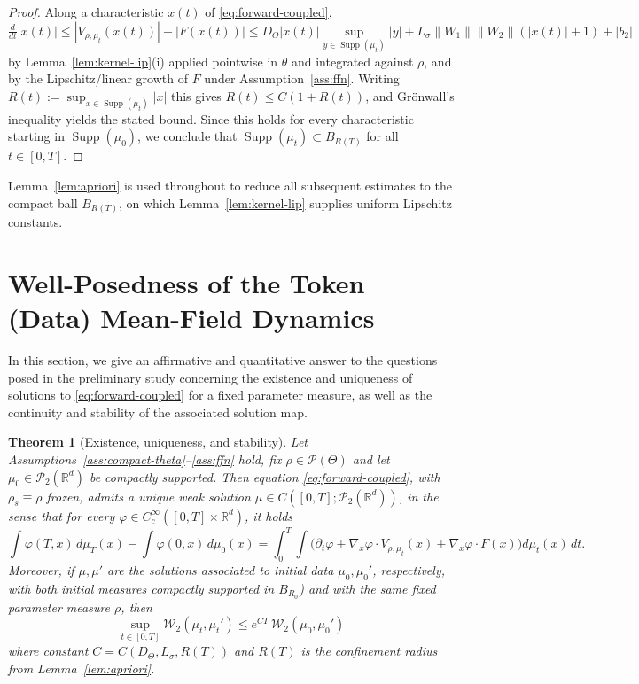 \documentclass[11pt,a4wide]{article}
\newtheorem{theorem}{Theorem}[section]
\theoremstyle{definition}
\newcommand{\R}{\mathbb{R}}
\newcommand{\Prob}{\mathcal{P}}
\newcommand{\Wass}{\mathcal{W}}
\DeclareMathOperator{\Supp}{Supp}
\begin{document}
\begin{proof}
Along a characteristic $x(t)$ of \eqref{eq:forward-coupled}, 
$$
\tfrac{d}{dt}|x(t)|\le |V_{\rho,\mu_t}(x(t))| + |F(x(t))| \le D_\Theta |x(t)| \sup_{y\in\Supp(\mu_t)}|y| + L_\sigma\|W_1\|\|W_2\|(|x(t)|+1)+|b_2|
$$
 by Lemma~\ref{lem:kernel-lip}(i) applied pointwise in $\theta$ and integrated against $\rho$, and by the Lipschitz/linear growth of $F$ under Assumption~\ref{ass:ffn}. Writing $R(t):=\sup_{x \in \Supp(\mu_t)}|x|$ this gives $\dot R(t)\le C(1+R(t))$, and Gr\"onwall's inequality yields the stated bound. Since this holds for every characteristic starting in $\Supp(\mu_0)$, we conclude that $\Supp(\mu_t)\subset B_{R(T)}$ for all $t\in[0,T]$.  
\end{proof}
 Lemma~\ref{lem:apriori} is used throughout to reduce all subsequent estimates to the compact ball $B_{R(T)}$, on which Lemma~\ref{lem:kernel-lip} supplies uniform Lipschitz constants.

\section{Well-Posedness of the Token (Data) Mean-Field Dynamics}
\label{sec:token-mf}

In this section,  we give an affirmative and quantitative answer  to the  questions posed in the preliminary study concerning the  existence and uniqueness of  solutions to \eqref{eq:forward-coupled} for a fixed parameter measure,  as well as the  continuity and stability of the associated solution map.

\begin{theorem}[Existence, uniqueness, and stability]
\label{thm:token-wp}
Let Assumptions~\ref{ass:compact-theta}--\ref{ass:ffn} hold, fix $\rho\in\Prob(\Theta)$ and let $\mu_0\in\Prob_2(\R^d)$ be compactly supported. Then equation \eqref{eq:forward-coupled}, with $\rho_s\equiv\rho$ frozen,  admits a unique weak solution $\mu\in C([0,T];\Prob_2(\R^d))$, in the sense that for every $\varphi\in C_c^\infty([0,T]\times\R^d)$, it holds
\begin{equation}
\int\varphi(T,x)\,d\mu_T(x) - \int\varphi(0,x)\,d\mu_0(x) = \int_0^T\!\!\int\Big(\partial_t\varphi + \nabla_x \varphi\cdot V_{\rho,\mu_t}(x) + \nabla_x \varphi \cdot F(x)\Big)d\mu_t(x)\,dt.
\end{equation}
Moreover, if $\mu,\mu'$ are the solutions associated to initial data $\mu_0,\mu_0'$, respectively, with both initial measures compactly supported in $B_{R_0}$) and with the same fixed parameter measure $\rho$, then
\begin{equation}
\sup_{t\in[0,T]}\Wass_2(\mu_t,\mu_t')\le e^{CT}\,\Wass_2(\mu_0,\mu_0')
\label{eq:stability}
\end{equation}
where constant  $C=C(D_\Theta,L_\sigma,R(T))$ and $R(T)$ is the confinement radius  from  Lemma~\ref{lem:apriori}.
\end{theorem}
\end{document}
